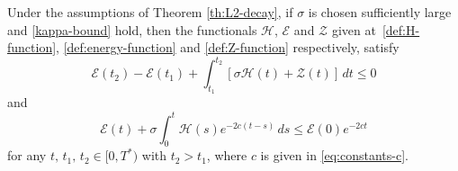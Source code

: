 \documentclass[10pt,a4paper]{amsart}
\begin{document}
\begin{theorem}\label{th:energy-estimates}
    Under the assumptions of Theorem \ref{th:L2-decay}, %
if $\sigma$ is chosen sufficiently large and \eqref{kappa-bound} hold,
   then the functionals $\mathcal H$, $\mathcal E$ and $\mathcal Z$ given at~\eqref{def:H-function}, \eqref{def:energy-function} and \eqref{def:Z-function} respectively, satisfy
    \begin{equation}\label{eq:inequality-EHZ1}
        \mathcal E(t_2)-\mathcal E(t_1) + \int_{t_1}^{t_2} \left[\sigma \mathcal H(t) +  \mathcal Z(t) \right]\,dt \leq 0
    \end{equation}
and  
    \begin{equation}\label{eq:gronw-energy}
        \mathcal{E}(t) + \sigma\int_0^t \mathcal H(s)e^{-2c(t-s)}\,ds \leq \mathcal E(0)e^{-2ct}
    \end{equation}
for any $t,\,t_1,\,t_2\in[0, T^*)$ with $t_2>t_1$, where $c$ is given in \eqref{eq:constants-c}. 
\end{theorem}
\end{document}
